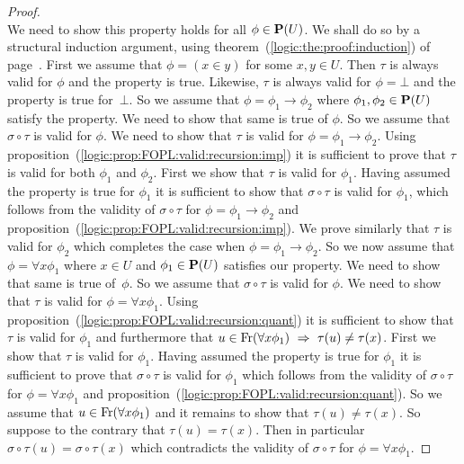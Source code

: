\begin{proof}
\[    \]
We need to show this property holds for all $\phi\in{\bf P}(U)$. We
shall do so by a structural induction argument, using
theorem~(\ref{logic:the:proof:induction}) of
page~\pageref{logic:the:proof:induction}. First we assume that
$\phi=(x\in y)$ for some $x,y\in U$. Then $\tau$ is always valid for
$\phi$ and the property is true. Likewise, $\tau$ is always valid
for $\phi=\bot$ and the property is true for~$\bot$. So we assume
that $\phi=\phi_{1}\to\phi_{2}$ where $\phi_{1},\phi_{2}\in{\bf
P}(U)$ satisfy the property. We need to show that same is true of
$\phi$. So we assume that $\sigma\circ\tau$ is valid for $\phi$. We
need to show that $\tau$ is valid for $\phi=\phi_{1}\to\phi_{2}$.
Using proposition~(\ref{logic:prop:FOPL:valid:recursion:imp}) it is
sufficient to prove that $\tau$ is valid for both $\phi_{1}$ and
$\phi_{2}$. First we show that $\tau$ is valid for $\phi_{1}$.
Having assumed the property is true for $\phi_{1}$ it is sufficient
to show that $\sigma\circ\tau$ is valid for $\phi_{1}$, which
follows from the validity of $\sigma\circ\tau$ for
$\phi=\phi_{1}\to\phi_{2}$ and
proposition~(\ref{logic:prop:FOPL:valid:recursion:imp}). We prove
similarly that $\tau$ is valid for $\phi_{2}$ which completes the
case when $\phi=\phi_{1}\to\phi_{2}$. So we now assume that
$\phi=\forall x\phi_{1}$ where $x\in U$ and $\phi_{1}\in{\bf P}(U)$
satisfies our property. We need to show that same is true of~$\phi$.
So we assume that $\sigma\circ\tau$ is valid for $\phi$. We need to
show that $\tau$ is valid for $\phi=\forall x\phi_{1}$. Using
proposition~(\ref{logic:prop:FOPL:valid:recursion:quant}) it is
sufficient to show that $\tau$ is valid for $\phi_{1}$ and
furthermore that $u\in\mbox{\rm Fr}(\forall x\phi_{1})\ \Rightarrow\
\tau(u)\neq\tau(x)$. First we show that $\tau$ is valid for
$\phi_{1}$. Having assumed the property is true for $\phi_{1}$ it is
sufficient to prove that $\sigma\circ\tau$ is valid for $\phi_{1}$
which follows from the validity of $\sigma\circ\tau$ for
$\phi=\forall x\phi_{1}$ and
proposition~(\ref{logic:prop:FOPL:valid:recursion:quant}). So we
assume that $u\in\mbox{\rm Fr}(\forall x\phi_{1})$ and it remains to show
that $\tau(u)\neq\tau(x)$. So suppose to the contrary that
$\tau(u)=\tau(x)$. Then in particular
$\sigma\circ\tau(u)=\sigma\circ\tau(x)$ which contradicts the
validity of $\sigma\circ\tau$ for $\phi=\forall x\phi_{1}$.
\end{proof}


